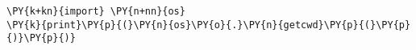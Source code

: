 \begin{Verbatim}[commandchars=\\\{\}]
\PY{k+kn}{import} \PY{n+nn}{os}
\PY{k}{print}\PY{p}{(}\PY{n}{os}\PY{o}{.}\PY{n}{getcwd}\PY{p}{(}\PY{p}{)}\PY{p}{)}
\end{Verbatim}
